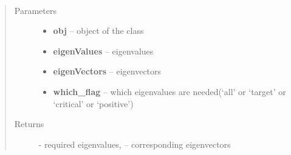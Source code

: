 \documentclass[letterpaper,10pt,english]{sphinxmanual}
\begin{document}
\begin{fulllineitems}
\label{index:brake.__init__.extractEigs}~\begin{quote}\begin{description}
\item[{Parameters}] \leavevmode\begin{itemize}
\item {} 
\textbf{obj} -- object of the class 

\item {} 
\textbf{eigenValues} -- eigenvalues

\item {} 
\textbf{eigenVectors} -- eigenvectors

\item {} 
\textbf{which\_flag} -- which eigenvalues are needed(`all' or `target' or `critical' or `positive')

\end{itemize}

\item[{Returns}] \leavevmode
{} - required eigenvalues,  -- corresponding eigenvectors

\end{description}\end{quote}

\end{fulllineitems}

\end{document}
